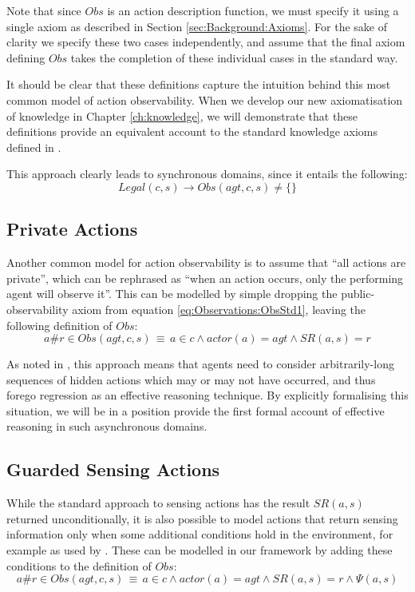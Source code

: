 Note that since $Obs$ is an action description function, we must
specify it using a single axiom as described in Section \ref{sec:Background:Axioms}.
For the sake of clarity we specify these two cases independently,
and assume that the final axiom defining $Obs$ takes the completion
of these individual cases in the standard way.

It should be clear that these definitions capture the intuition behind
this most common model of action observability. When we develop our
new axiomatisation of knowledge in Chapter \ref{ch:knowledge}, we
will demonstrate that these definitions provide an equivalent account
to the standard knowledge axioms defined in \citep{scherl03sc_knowledge}.

This approach clearly leads to synchronous domains, since it entails
the following:\[
Legal(c,s)\rightarrow Obs(agt,c,s)\neq\{\}\]



\subsection{Private Actions}

Another common model for action observability is to assume that {}``all
actions are private'', which can be rephrased as {}``when an action
occurs, only the performing agent will observe it''. This can be
modelled by simple dropping the public-observability axiom from equation
\ref{eq:Observations:ObsStd1}, leaving the following definition of
$Obs$:\[
a\#r\in Obs(agt,c,s)\,\equiv\, a\in c\wedge actor(a)=agt\wedge SR(a,s)=r\]


As noted in \citep{Lesperance99sitcalc_approach}, this approach means
that agents need to consider arbitrarily-long sequences of hidden
actions which may or may not have occurred, and thus forego regression
as an effective reasoning technique. By explicitly formalising this
situation, we will be in a position provide the first formal account
of effective reasoning in such asynchronous domains.


\subsection{Guarded Sensing Actions\label{sec:Observations:Guarded-Sensing}}

While the standard approach to sensing actions has the result $SR(a,s)$
returned unconditionally, it is also possible to model actions that
return sensing information only when some additional conditions hold
in the environment, for example as used by \citet{Petrick06thesis}.
These can be modelled in our framework by adding these conditions
to the definition of $Obs$:\[
a\#r\in Obs(agt,c,s)\,\equiv\, a\in c\wedge actor(a)=agt\wedge SR(a,s)=r\wedge\Psi(a,s)\]


